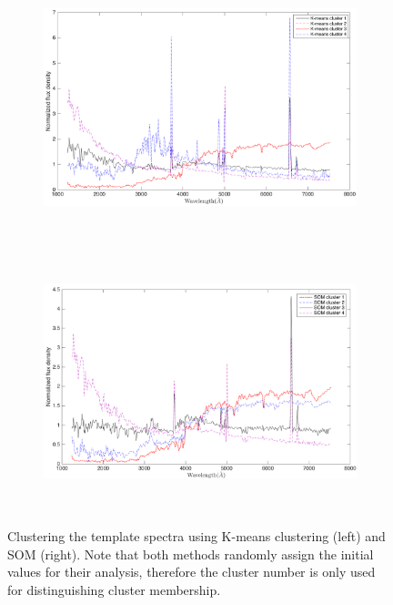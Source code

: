     \begin{figure}
    \begin{subfigure}[b]{0.49\textwidth}
        \centering
        \includegraphics[width=.99\textwidth, height=         7.5cm]{k_means_images/classified_group_in_4cluster_kinney.png}
    \end{subfigure}
    \hfill
        \begin{subfigure}[b]{0.49\textwidth}
        \centering \includegraphics[width=.99\textwidth, height=         7.5cm]{k_means_images/classified_group_in_4cluster_som.png}
    \end{subfigure}
    \caption{Clustering the  template spectra using K-means clustering     (left) and SOM (right). Note that both methods randomly assign the initial values for their analysis, therefore the cluster number is only used for distinguishing cluster membership.}
    \label{fig: som_k_means_4}
    \end{figure}
        
